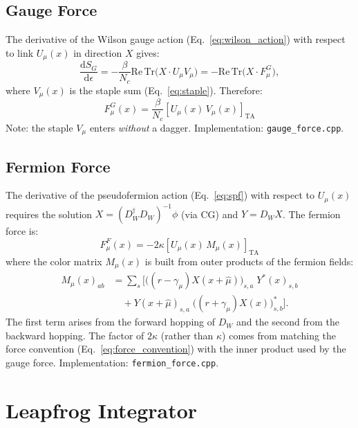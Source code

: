 \documentclass[12pt]{article}
\newcommand{\dd}{\mathrm{d}}
\newcommand{\ReTr}{\mathrm{Re\,Tr}}
\newcommand{\code}[1]{\texttt{#1}}
\begin{document}
\subsection{Gauge Force}

The derivative of the Wilson gauge action (Eq.~\ref{eq:wilson_action}) with respect to link $U_\mu(x)$ in direction $X$ gives:
\begin{equation}
\frac{\dd S_G}{\dd \epsilon} = -\frac{\beta}{N_c} \ReTr\!\big(X \cdot U_\mu V_\mu\big) = -\ReTr\!\big(X \cdot F_\mu^G\big),
\end{equation}
where $V_\mu(x)$ is the staple sum (Eq.~\ref{eq:staple}). Therefore:
\begin{equation}
\label{eq:gauge_force}
\boxed{F_\mu^G(x) = \frac{\beta}{N_c} \left[U_\mu(x) \, V_\mu(x)\right]_{\mathrm{TA}}}
\end{equation}
Note: the staple $V_\mu$ enters \textit{without} a dagger. Implementation: \code{gauge\_force.cpp}.

\subsection{Fermion Force}

The derivative of the pseudofermion action (Eq.~\ref{eq:spf}) with respect to $U_\mu(x)$ requires the solution $X = (D_W^\dagger D_W)^{-1} \phi$ (via CG) and $Y = D_W X$. The fermion force is:
\begin{equation}
\label{eq:fermion_force}
\boxed{F_\mu^F(x) = -2\kappa \left[U_\mu(x) \, M_\mu(x)\right]_{\mathrm{TA}}}
\end{equation}
where the color matrix $M_\mu(x)$ is built from outer products of the fermion fields:
\begin{align}
M_\mu(x)_{ab} &= \sum_s \Big[
\big((r - \gamma_\mu) X(x + \hat{\mu})\big)_{s,a} \; Y^*(x)_{s,b} \nonumber \\
&\quad + Y(x + \hat{\mu})_{s,a} \; \big((r + \gamma_\mu) X(x)\big)^*_{s,b}
\Big].
\end{align}
The first term arises from the forward hopping of $D_W$ and the second from the backward hopping. The factor of $2\kappa$ (rather than $\kappa$) comes from matching the force convention (Eq.~\ref{eq:force_convention}) with the inner product used by the gauge force. Implementation: \code{fermion\_force.cpp}.


\section{Leapfrog Integrator}
\label{sec:leapfrog}
\end{document}
